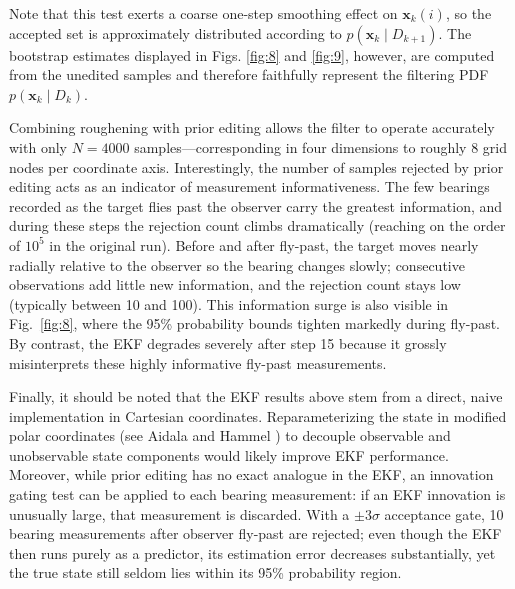 Note that this test exerts a coarse one-step smoothing effect on $\bm{x}_k(i)$, so the accepted set is approximately distributed according to $p(\bm{x}_k \mid D_{k+1})$. The bootstrap estimates displayed in Figs. \ref{fig:8} and \ref{fig:9}, however, are computed from the unedited samples and therefore faithfully represent the filtering PDF $p(\bm{x}_k \mid D_k)$.

Combining roughening with prior editing allows the filter to operate accurately with only $N = 4000$ samples—corresponding in four dimensions to roughly 8 grid nodes per coordinate axis. Interestingly, the number of samples rejected by prior editing acts as an indicator of measurement informativeness. The few bearings recorded as the target flies past the observer carry the greatest information, and during these steps the rejection count climbs dramatically (reaching on the order of $10^5$ in the original run). Before and after fly-past, the target moves nearly radially relative to the observer so the bearing changes slowly; consecutive observations add little new information, and the rejection count stays low (typically between 10 and 100). This information surge is also visible in Fig.~\ref{fig:8}, where the 95\% probability bounds tighten markedly during fly-past. By contrast, the EKF degrades severely after step 15 because it grossly misinterprets these highly informative fly-past measurements.

Finally, it should be noted that the EKF results above stem from a direct, naive implementation in Cartesian coordinates. Reparameterizing the state in modified polar coordinates (see Aidala and Hammel \cite{r17}) to decouple observable and unobservable state components would likely improve EKF performance. Moreover, while prior editing has no exact analogue in the EKF, an innovation gating test can be applied to each bearing measurement: if an EKF innovation is unusually large, that measurement is discarded. With a $\pm 3\sigma$ acceptance gate, 10 bearing measurements after observer fly-past are rejected; even though the EKF then runs purely as a predictor, its estimation error decreases substantially, yet the true state still seldom lies within its 95\% probability region.
